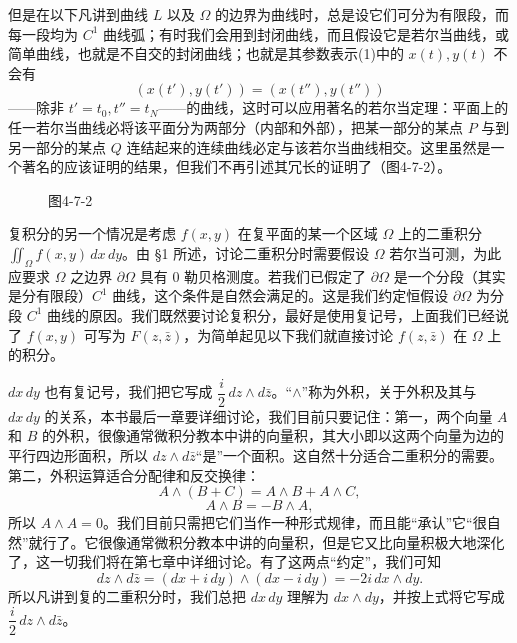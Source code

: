 但是在以下凡讲到曲线 $L$ 以及 $\Omega$ 的边界为曲线时，总是设它们可分为有限段，而每一段均为 $C^1$ 曲线弧；有时我们会用到封闭曲线，而且假设它是若尔当曲线，或简单曲线，也就是不自交的封闭曲线；也就是其参数表示(1)中的 $x(t),y(t)$ 不会有
\[
 (x(t'),y(t'))=(x(t''),y(t''))
\]
——除非 $t'=t_0,t''=t_N$——的曲线，这时可以应用著名的若尔当定理：平面上的任一若尔当曲线必将该平面分为两部分（内部和外部），把某一部分的某点 $P$ 与到另一部分的某点 $Q$ 连结起来的连续曲线必定与该若尔当曲线相交。这里虽然是一个著名的应该证明的结果，但我们不再引述其冗长的证明了（图4-7-2）。

\begin{figure}[htbp]
\centering
{}
\caption*{图4-7-2}
\end{figure}

复积分的另一个情况是考虑 $f(x,y)$ 在复平面的某一个区域 $\Omega$ 上的二重积分 $\iint_\Omega f(x,y)\,dx\,dy$。由 §1 所述，讨论二重积分时需要假设 $\Omega$ 若尔当可测，为此应要求 $\Omega$ 之边界 $\partial\Omega$ 具有 0 勒贝格测度。若我们已假定了 $\partial\Omega$ 是一个分段（其实是分有限段）$C^1$ 曲线，这个条件是自然会满足的。这是我们约定恒假设 $\partial\Omega$ 为分段 $C^1$ 曲线的原因。我们既然要讨论复积分，最好是使用复记号，上面我们已经说了 $f(x,y)$ 可写为 $F(z,\bar z)$，为简单起见以下我们就直接讨论 $f(z,\bar z)$ 在 $\Omega$ 上的积分。

$dx\,dy$ 也有复记号，我们把它写成 $\dfrac{i}{2}\,dz\wedge d\bar z$。“$\wedge$”称为外积，关于外积及其与 $dx\,dy$ 的关系，本书最后一章要详细讨论，我们目前只要记住：第一，两个向量 $A$ 和 $B$ 的外积，很像通常微积分教本中讲的向量积，其大小即以这两个向量为边的平行四边形面积，所以 $dz\wedge d\bar z$“是”一个面积。这自然十分适合二重积分的需要。第二，外积运算适合分配律和反交换律：
\[
 A\wedge(B+C)=A\wedge B+A\wedge C,
\]
\[
 A\wedge B=-B\wedge A,
\]
所以 $A\wedge A=0$。我们目前只需把它们当作一种形式规律，而且能“承认”它“很自然”就行了。它很像通常微积分教本中讲的向量积，但是它又比向量积极大地深化了，这一切我们将在第七章中详细讨论。有了这两点“约定”，我们可知
\begin{equation}
 dz\wedge d\bar z=(dx+i\,dy)\wedge(dx-i\,dy)=-2i\,dx\wedge dy.
 \tag{9}
\end{equation}
所以凡讲到复的二重积分时，我们总把 $dx\,dy$ 理解为 $dx\wedge dy$，并按上式将它写成 $\dfrac i2\,dz\wedge d\bar z$。

